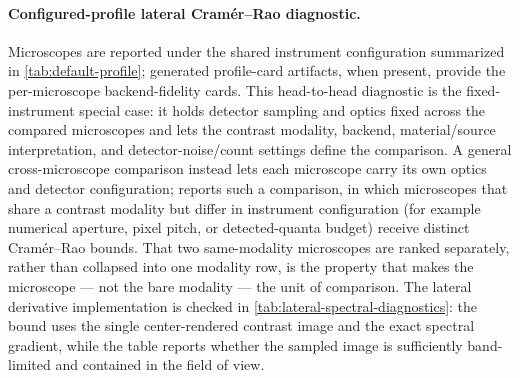 \paragraph{Configured-profile lateral Cram\'{e}r--Rao diagnostic.} Microscopes are reported under the shared instrument configuration summarized in \cref{tab:default-profile}; generated profile-card artifacts, when present, provide the per-microscope backend-fidelity cards. This head-to-head diagnostic is the fixed-instrument special case: it holds detector sampling and optics fixed across the compared microscopes and lets the contrast modality, backend, material/source interpretation, and detector-noise/count settings define the comparison. A general cross-microscope comparison instead lets each microscope carry its own optics and detector configuration;  reports such a comparison, in which microscopes that share a contrast modality but differ in instrument configuration (for example numerical aperture, pixel pitch, or detected-quanta budget) receive distinct Cram\'{e}r--Rao bounds. That two same-modality microscopes are ranked separately, rather than collapsed into one modality row, is the property that makes the microscope --- not the bare modality --- the unit of comparison. The lateral derivative implementation is checked in \cref{tab:lateral-spectral-diagnostics}: the bound uses the single center-rendered contrast image and the exact spectral gradient, while the table reports whether the sampled image is sufficiently band-limited and contained in the field of view.


